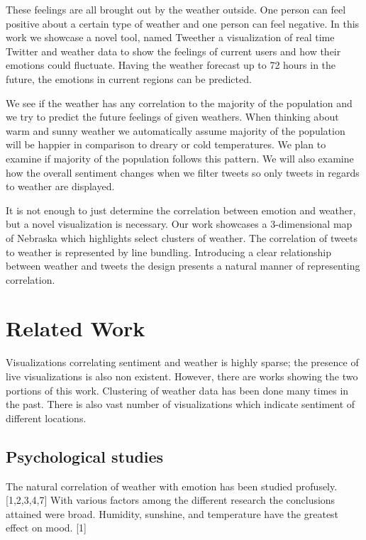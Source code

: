 \documentclass[journal]{vgtc}                %
\begin{document}
These feelings are all brought out by the weather outside. One person can feel positive about a certain type of weather and one person can feel negative. In this work we showcase a novel tool, named Tweether a visualization of real time Twitter and weather data to show the feelings of current users and how their emotions could fluctuate. Having the weather forecast up to 72 hours in the future, the emotions in current regions can be predicted. 

We see if the weather has any correlation to the majority of the population and we try to predict the future feelings of given weathers.  When thinking about warm and sunny weather we automatically assume majority of the population will be happier in comparison to dreary or cold temperatures. We plan to examine if majority of the population follows this pattern. We will also examine how the overall sentiment changes when we filter tweets so only tweets in regards to weather are displayed.

It is not enough to just determine the correlation between emotion and weather, but a novel visualization is necessary. Our work showcases a 3-dimensional map of Nebraska which highlights select clusters of weather. The correlation of tweets to weather is represented by line bundling. Introducing a clear relationship between weather and tweets the design presents a natural manner of representing correlation.


\section{Related Work}

Visualizations correlating sentiment and weather is highly sparse; the presence of live visualizations is also non existent. However, there are works showing the two portions of this work. Clustering of weather data has been done many times in the past. There is also vast number of visualizations which indicate sentiment of different locations.

\subsection{Psychological studies}

The natural correlation of weather with emotion has been studied profusely. [1,2,3,4,7] With various factors among the different research the conclusions attained were broad. Humidity, sunshine, and temperature have the greatest effect on mood. [1]  
\end{document}
